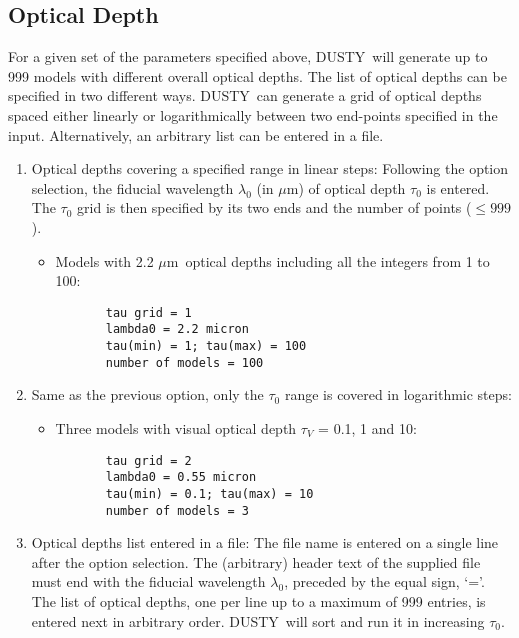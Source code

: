 \documentclass[12pt]{article} \usepackage{epsf}
\def\D  {{\sf DUSTY}}
\def\mic    {\hbox{$\mu$m}}
\begin{document}
\subsection{Optical Depth}

For a given set of the parameters specified above, \D\ will generate up to 999
models with different overall optical depths.  The list of optical depths can
be specified in two different ways.  \D\ can generate a grid of optical depths
spaced either linearly or logarithmically between two end-points specified in
the input.  Alternatively, an arbitrary list can be entered in a file.

\begin{enumerate}

\item Optical depths covering a specified range in linear steps:  Following the
option selection, the fiducial wavelength $\lambda_0$ (in \mic) of optical
depth $\tau_0$ is entered.  The $\tau_0$ grid is then specified by its two ends
and the number of points ($\le 999$).

\begin{itemize}
\item Models with 2.2 \mic\ optical depths including all the integers from 1 to
100:

\begin{verbatim}
       tau grid = 1
       lambda0 = 2.2 micron
       tau(min) = 1; tau(max) = 100
       number of models = 100
\end{verbatim}
\end{itemize}

\item Same as the previous option, only the $\tau_0$ range is covered in
logarithmic steps:

\begin{itemize}
\item Three models with visual optical depth $\tau_V$ =  0.1, 1 and 10:
\begin{verbatim}
       tau grid = 2
       lambda0 = 0.55 micron
       tau(min) = 0.1; tau(max) = 10
       number of models = 3
\end{verbatim}
\end{itemize}

\item
Optical depths list entered in a file: The file name is entered on a single
line after the option selection. The (arbitrary) header text of the supplied
file must end with the fiducial wavelength $\lambda_0$, preceded by the equal
sign, `='. The list of optical depths, one per line up to a maximum of 999
entries, is entered next in arbitrary order.  \D\ will sort and run it in
increasing $\tau_0$.


\end{enumerate}
\end{document}
